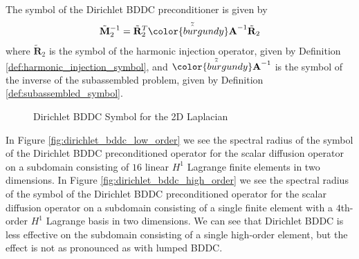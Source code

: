 \begin{definition}
The symbol of the Dirichlet BDDC preconditioner is given by
\begin{equation}
\tilde{\mathbf{M}}^{-1}_2 = \tilde{\mathbf{R}}^T_2 \tilde{\hat{{\color{burgundy}\mathbf{A}}}}^{-1} \tilde{\mathbf{R}}_2
\end{equation}
where $\tilde{\mathbf{R}}_2$ is the symbol of the harmonic injection operator, given by Definition \ref{def:harmonic_injection_symbol}, and $\tilde{\hat{{\color{burgundy}\mathbf{A}}}}^{-1}$ is the symbol of the inverse of the subassembled problem, given by Definition \ref{def:subassembled_symbol}. 
\label{def:dirichlet_bddc_symbol}
\end{definition}

\begin{figure}[!ht]
  \centering
  \hfill
  \caption{Dirichlet BDDC Symbol for the 2D Laplacian}
\end{figure}

In Figure \ref{fig:dirichlet_bddc_low_order} we see the spectral radius of the symbol of the Dirichlet BDDC preconditioned operator for the scalar diffusion operator on a subdomain consisting of $16$ linear $H^1$ Lagrange finite elements in two dimensions.
In Figure \ref{fig:dirichlet_bddc_high_order} we see the spectral radius of the symbol of the Dirichlet BDDC preconditioned operator for the scalar diffusion operator on a subdomain consisting of a single finite element with a $4$th-order $H^1$ Lagrange basis in two dimensions.
We can see that Dirichlet BDDC is less effective on the subdomain consisting of a single high-order element, but the effect is not as pronounced as with lumped BDDC.
